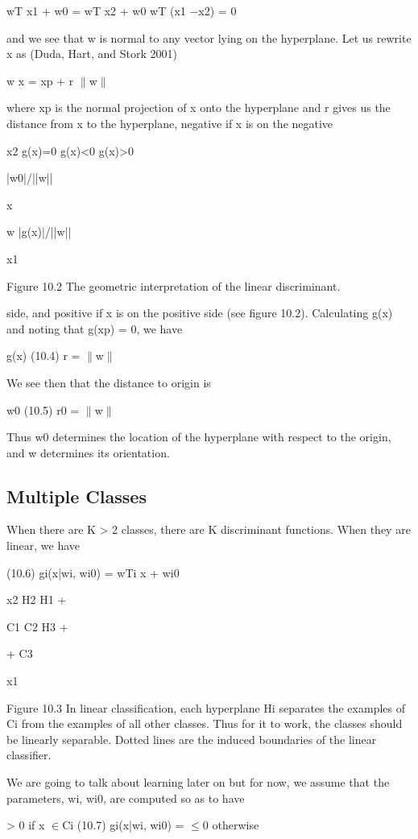 wT x1 + w0 = wT x2 + w0 wT (x1 $-$x2) = 0

and we see that w is normal to any vector lying on the hyperplane. Let us rewrite x as (Duda, Hart, and Stork 2001)

w x = xp + r $\parallel$w$\parallel$

where xp is the normal projection of x onto the hyperplane and r gives us the distance from x to the hyperplane, negative if x is on the negative

x2 g(x)=0 g(x)<0 g(x)>0

|w0|/||w||

x

w |g(x)|/||w||

x1

Figure 10.2 The geometric interpretation of the linear discriminant.

side, and positive if x is on the positive side (see figure 10.2). Calculating g(x) and noting that g(xp) = 0, we have

g(x) (10.4) r = $\parallel$w$\parallel$

We see then that the distance to origin is

w0 (10.5) r0 = $\parallel$w$\parallel$

Thus w0 determines the location of the hyperplane with respect to the origin, and w determines its orientation.

\subsection{Multiple Classes}

When there are K > 2 classes, there are K discriminant functions. When they are linear, we have

(10.6) gi(x|wi, wi0) = wTi x + wi0

x2 H2 H1 +

C1 C2 H3 +

+ C3

x1

Figure 10.3 In linear classification, each hyperplane Hi separates the examples of Ci from the examples of all other classes. Thus for it to work, the classes should be linearly separable. Dotted lines are the induced boundaries of the linear classifier.

We are going to talk about learning later on but for now, we assume that the parameters, wi, wi0, are computed so as to have

> 0 if x $\in$Ci (10.7) gi(x|wi, wi0) = $\leq$0 otherwise

